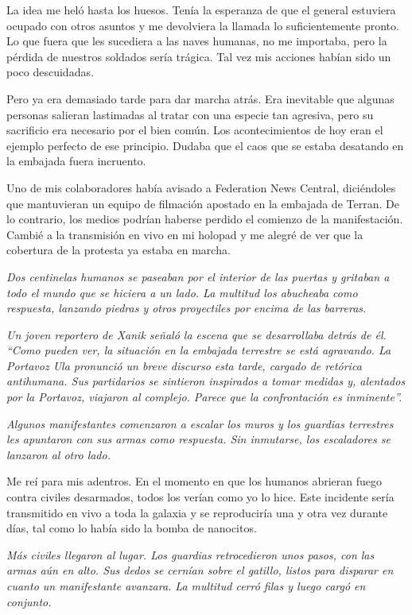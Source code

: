 La idea me heló hasta los huesos. Tenía la esperanza de que el general estuviera ocupado con otros asuntos y me devolviera la llamada lo suficientemente pronto. Lo que fuera que les sucediera a las naves humanas, no me importaba, pero la pérdida de nuestros soldados sería trágica. Tal vez mis acciones habían sido un poco descuidadas.

Pero ya era demasiado tarde para dar marcha atrás. Era inevitable que algunas personas salieran lastimadas al tratar con una especie tan agresiva, pero su sacrificio era necesario por el bien común. Los acontecimientos de hoy eran el ejemplo perfecto de ese principio. Dudaba que el caos que se estaba desatando en la embajada fuera incruento.

Uno de mis colaboradores había avisado a Federation News Central, diciéndoles que mantuvieran un equipo de filmación apostado en la embajada de Terran. De lo contrario, los medios podrían haberse perdido el comienzo de la manifestación. Cambié a la transmisión en vivo en mi holopad y me alegré de ver que la cobertura de la protesta ya estaba en marcha.

\textit{Dos centinelas humanos se paseaban por el interior de las puertas y gritaban a todo el mundo que se hiciera a un lado. La multitud los abucheaba como respuesta, lanzando piedras y otros proyectiles por encima de las barreras.}

\textit{Un joven reportero de Xanik señaló la escena que se desarrollaba detrás de él. ``Como pueden ver, la situación en la embajada terrestre se está agravando. La Portavoz Ula pronunció un breve discurso esta tarde, cargado de retórica antihumana. Sus partidarios se sintieron inspirados a tomar medidas y, alentados por la Portavoz, viajaron al complejo. Parece que la confrontación es inminente''.}

\textit{Algunos manifestantes comenzaron a escalar los muros y los guardias terrestres les apuntaron con sus armas como respuesta. Sin inmutarse, los escaladores se lanzaron al otro lado.}

Me reí para mis adentros. En el momento en que los humanos abrieran fuego contra civiles desarmados, todos los verían como yo lo hice. Este incidente sería transmitido en vivo a toda la galaxia y se reproduciría una y otra vez durante días, tal como lo había sido la bomba de nanocitos.

\textit{Más civiles llegaron al lugar. Los guardias retrocedieron unos pasos, con las armas aún en alto. Sus dedos se cernían sobre el gatillo, listos para disparar en cuanto un manifestante avanzara. La multitud cerró filas y luego cargó en conjunto.}

